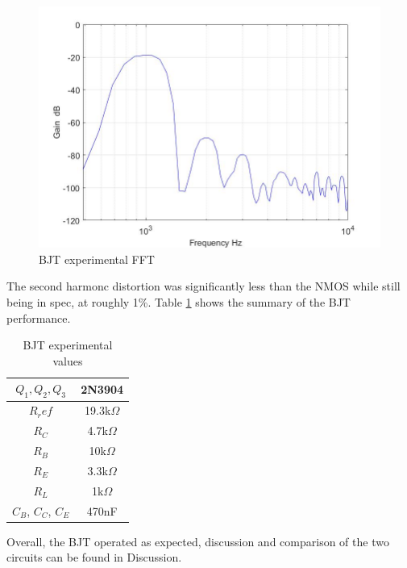 \begin{figure}[H]
	\centering
	\includegraphics[width=0.7\linewidth]{ExperimentalImplementation/bjt_fft.jpg}
	\caption{BJT experimental FFT}
	\label{fig:bjtexpfft}
\end{figure}

The second harmonc distortion was significantly less than the NMOS while still being in spec, at roughly 1\%. Table \ref{tab:bjtexp} shows the summary of the BJT performance.




\begin{table}[H]
	\centering
	\caption{BJT experimental values}
	\label{tab:bjtexp}
	\begin{tabular}{cc}
		$Q_1, Q_2, Q_3$ & 2N3904        \\ \hline
		$R_ref$         & 19.3k$\Omega$ \\ \hline
		$R_C$           & 4.7k$\Omega$  \\ \hline
		$R_B$           & 10k$\Omega$   \\ \hline 
		$R_E$           & 3.3k$\Omega$  \\ \hline 
		$R_L$           & 1k$\Omega$    \\ \hline
		$C_B$, $C_C$, $C_E$ & 470nF     \\ \hline
	\end{tabular}
\end{table}

Overall, the BJT operated as expected, discussion and comparison of the two circuits can be found in Discussion.


%




